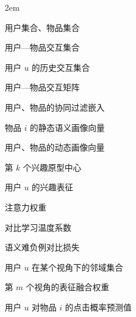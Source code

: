 
\begin{notation}

  \begin{notationlist}{2em}
    \item[$\displaystyle \mathcal{U}, \mathcal{I}$] 用户集合、物品集合
    \item[$\displaystyle \mathcal{O}$] 用户—物品交互集合
    \item[$\displaystyle \mathcal{H}_u$] 用户 $u$ 的历史交互集合
    \item[$\displaystyle \mathbf{X}$] 用户—物品交互矩阵
    \item[$\displaystyle \mathbf{e}_u, \mathbf{e}_i$] 用户、物品的协同过滤嵌入
    \item[$\displaystyle \mathbf{p}_i$] 物品 $i$ 的静态语义画像向量
    \item[$\displaystyle \mathbf{d}_u, \mathbf{d}_i$] 用户、物品的动态画像向量
    \item[$\displaystyle \mathbf{c}_k$] 第 $k$ 个兴趣原型中心
    \item[$\displaystyle \mathbf{h}_u$] 用户 $u$ 的兴趣表征
    \item[$\displaystyle \alpha_{j}$] 注意力权重
    \item[$\displaystyle \tau$] 对比学习温度系数
    \item[$\displaystyle \mathcal{L}_{\mathrm{contra}}$] 语义难负例对比损失
    \item[$\displaystyle \mathcal{N}_u^{\ast}$] 用户 $u$ 在某个视角下的邻域集合
    \item[$\displaystyle w_m$] 第 $m$ 个视角的表征融合权重
    \item[$\displaystyle \hat{y}_{ui}$] 用户 $u$ 对物品 $i$ 的点击概率预测值
  \end{notationlist}

\end{notation}

